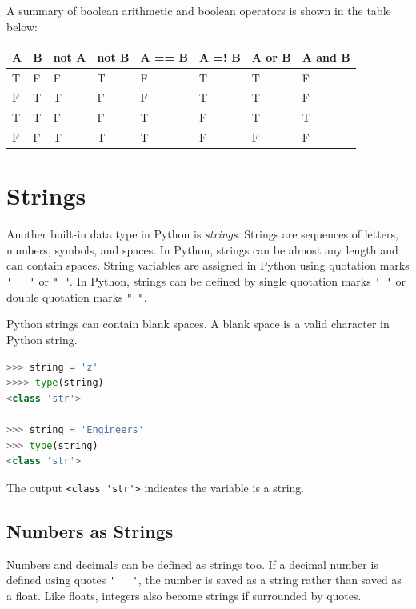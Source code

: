 \documentclass{book}
\begin{document}
    
        A summary of boolean arithmetic and boolean operators is shown in the
table below:

\begin{longtable}[]{@{}llllllll@{}}
\toprule
A & B & not A & not B & A == B & A =! B & A or B & A and
B\tabularnewline
\midrule
\endhead
T & F & F & T & F & T & T & F\tabularnewline
F & T & T & F & F & T & T & F\tabularnewline
T & T & F & F & T & F & T & T\tabularnewline
F & F & T & T & T & F & F & F\tabularnewline
\bottomrule
\end{longtable}
    




    
        \section{Strings}\label{strings}
    




    
        Another built-in data type in Python is \emph{strings}. Strings are
sequences of letters, numbers, symbols, and spaces. In Python, strings
can be almost any length and can contain spaces. String variables are
assigned in Python using quotation marks \lstinline!'   '! or
\lstinline!" "!. In Python, strings can be defined by single quotation
marks \lstinline!' '! or double quotation marks \lstinline!" "!.

Python strings can contain blank spaces. A blank space is a valid
character in Python string.

\begin{lstlisting}[language=Python]
>>> string = 'z'
>>>> type(string)
<class 'str'>

>>> string = 'Engineers'
>>> type(string)
<class 'str'>
\end{lstlisting}

The output \lstinline!<class 'str'>! indicates the variable is a string.
    




    
        \subsection{Numbers as Strings}\label{numbers-as-strings}

Numbers and decimals can be defined as strings too. If a decimal number
is defined using quotes \lstinline!'   '!, the number is saved as a
string rather than saved as a float. Like floats, integers also become
strings if surrounded by quotes.
\end{document}
